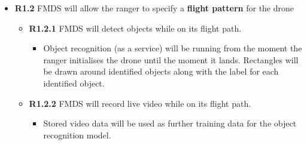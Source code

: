 \begin{flushleft}
\begin{itemize}
\begin{itemize}
		  			\item{\textbf{R1.2}} FMDS will allow the ranger to specify a \textbf{flight pattern} for the drone
		  				\begin{itemize}
		  					\item{\textbf{R1.2.1}} FMDS will detect objects while on its flight path.
								\begin{itemize}
									\item Object recognition (as a service) will be running from the moment the ranger initialises the drone until the moment it lands. Rectangles will be drawn around identified objects along with the label for each identified object.
								\end{itemize}
		  					\item{\textbf{R1.2.2}} FMDS will record live video while on its flight path.
								\begin{itemize}
									\item Stored video data will be used as further training data for the object recognition model.
								\end{itemize}
						  \end{itemize}
			\end{itemize}
		\end{itemize}


\end{flushleft}
